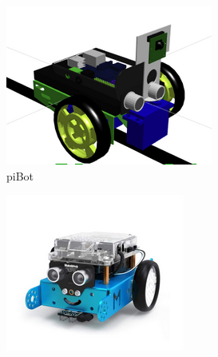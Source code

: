 \begin{figure}[h!]
  \begin{subfigure}[b]{0.2\textwidth}
    \includegraphics[width=\textwidth, height=\textwidth]{pibot.png}
    \caption{piBot}
  \end{subfigure}
  \hfill
  \begin{subfigure}[b]{0.2\textwidth}
    \includegraphics[width=\textwidth, height=\textwidth]{mbot.png}

\end{subfigure}
\end{figure}

